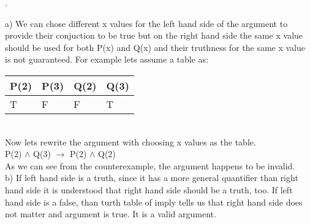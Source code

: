 \documentclass[12pt]{article}
\begin{document}
. 

a) We can chose different x values for the left hand side of the argument to provide their conjuction to be true but on the right hand side the same x value should be used for both P(x) and Q(x) and their truthness for the same x value is not guaranteed. For example lets assume a table as:
\begin{table}[ht]
\centering
\begin{tabular}{|l|l|l|l|} 
\hline
P(2) & P(3) & Q(2) & Q(3)  \\ 
\hline
T    & F    & F    & T     \\
\hline
\end{tabular}
\end{table}\\
Now lets rewrite the argument with choosing x values as the table.\\
P(2) $\land$ Q(3) $\rightarrow$ P(2) $\land$ Q(2)\\
As we can see from the counterexample, the argument happens to be invalid.\\


b) If left hand side is a truth, since it has a more general quantifier than right hand side it is understood that right hand side should be a truth, too. If left hand side is a false, than turth table of imply tells us that right hand side does not matter and argument is true. It is a valid argument.\\
\clearpage
\end{document}
